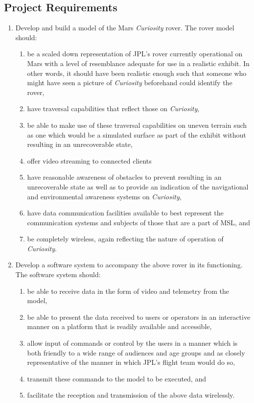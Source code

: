   \subsection{Project Requirements}
  \label{subsec:probDef-projectRequirements}
  \begin{enumerate}
    \item Develop and build a model of the Mars \textit{Curiosity} rover. The rover model should:
    \begin{enumerate}
      \item\label{enum:req-scaledrover} be a scaled down representation of JPL's rover currently operational on Mars with a level of resemblance adequate for use in a realistic exhibit. In other words, it should have been realistic enough such that someone who might have seen a picture of \textit{Curiosity} beforehand could identify the rover,
      \item have traversal capabilities that reflect those on \textit{Curiosity},
      \item be able to make use of these traversal capabilities on uneven terrain such as one which would be a simulated surface as part of the exhibit without resulting in an unrecoverable state,
      \item offer video streaming to connected clients
      \item have reasonable awareness of obstacles to prevent resulting in an unrecoverable state as well as to provide an indication of the navigational and environmental awareness systems on \textit{Curiosity},
      \item have data communication facilities available to best represent the communication systems and subjects of those that are a part of MSL, and
      \item be completely wireless, again reflecting the nature of operation of \textit{Curiosity}.
    \end{enumerate}
    \item Develop a software system to accompany the above rover in its functioning. The software system should:
    \begin{enumerate}
      \item be able to receive data in the form of video and telemetry from the model,
      \item be able to present the data received to users or operators in an interactive manner on a platform that is readily available and accessible,
      \item allow input of commands or control by the users in a manner which is both friendly to a wide range of audiences and age groups and as closely representative of the manner in which JPL's flight team would do so,
      \item transmit these commands to the model to be executed, and
      \item facilitate the reception and transmission of the above data wirelessly.
    \end{enumerate}
  \end{enumerate}

